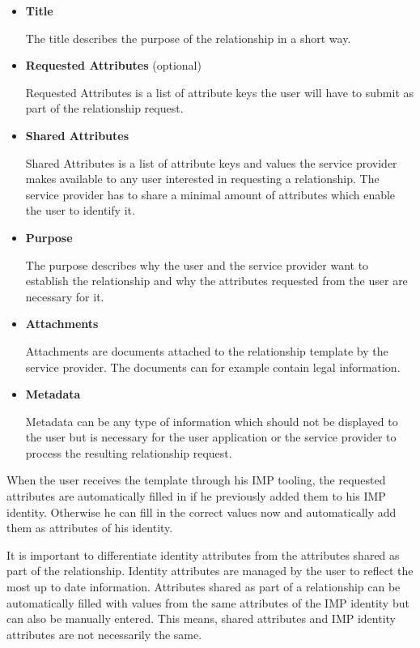 \begin{itemize}
    \item \textbf{Title}
    
    The title describes the purpose of the relationship in a short way.
    
    \item \textbf{Requested Attributes} (optional)
    
    Requested Attributes is a list of attribute keys the user will have to submit as part of the relationship request.
    
    \item \textbf{Shared Attributes}
    
    Shared Attributes is a list of attribute keys and values the service provider makes available to any user interested in requesting a relationship. The service provider has to share a minimal amount of attributes which enable the user to identify it. 
    
    \item \textbf{Purpose}
    
    The purpose describes why the user and the service provider want to establish the relationship and why the attributes requested from the user are necessary for it.
    
    \item \textbf{Attachments}
    
    Attachments are documents attached to the relationship template by the service provider. The documents can for example contain legal information.
    
    \item \textbf{Metadata}
    
    Metadata can be any type of information which should not be displayed to the user but is necessary for the user application or the service provider to process the resulting relationship request.
    
\end{itemize}

When the user receives the template through his IMP tooling, the requested attributes are automatically filled in if he previously added them to his IMP identity. Otherwise he can fill in the correct values now and automatically add them as attributes of his identity.

It is important to differentiate identity attributes from the attributes shared as part of the relationship. Identity attributes are managed by the user to reflect the most up to date information. Attributes shared as part of a relationship can be automatically filled with values from the same attributes of the IMP identity but can also be manually entered. This means, shared attributes and IMP identity attributes are not necessarily the same.

